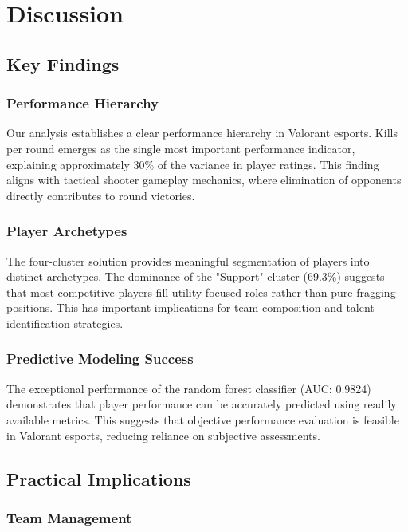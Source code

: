\documentclass[11pt,a4paper]{article}
\begin{document}
\section{Discussion}

\subsection{Key Findings}

\subsubsection{Performance Hierarchy}

Our analysis establishes a clear performance hierarchy in Valorant esports. Kills per round emerges as the single most important performance indicator, explaining approximately 30\% of the variance in player ratings. This finding aligns with tactical shooter gameplay mechanics, where elimination of opponents directly contributes to round victories.

\subsubsection{Player Archetypes}

The four-cluster solution provides meaningful segmentation of players into distinct archetypes. The dominance of the "Support" cluster (69.3\%) suggests that most competitive players fill utility-focused roles rather than pure fragging positions. This has important implications for team composition and talent identification strategies.

\subsubsection{Predictive Modeling Success}

The exceptional performance of the random forest classifier (AUC: 0.9824) demonstrates that player performance can be accurately predicted using readily available metrics. This suggests that objective performance evaluation is feasible in Valorant esports, reducing reliance on subjective assessments.

\subsection{Practical Implications}

\subsubsection{Team Management}
\end{document}
